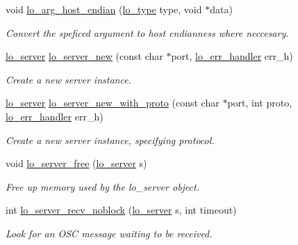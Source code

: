 \begin{CompactItemize}
void \hyperlink{group__liblolowlevel_g29fc246595334f29d97d11b0186b17bd}{lo\_\-arg\_\-host\_\-endian} (\hyperlink{group__liblo_g11838c576b0197c255ce805fd7434736}{lo\_\-type} type, void $\ast$data)
\begin{CompactList}\small\item\em Convert the speficed argument to host endianness where neccesary. \item\end{CompactList}\item 
\hyperlink{lo__types_8h_59067bf50cf8abb4371da6f03c9036c9}{lo\_\-server} \hyperlink{group__liblolowlevel_g78cfb23346e44465695293d4393447ae}{lo\_\-server\_\-new} (const char $\ast$port, \hyperlink{lo__types_8h_6663024c5970f397af12afdb906ab9bd}{lo\_\-err\_\-handler} err\_\-h)
\begin{CompactList}\small\item\em Create a new server instance. \item\end{CompactList}\item 
\hyperlink{lo__types_8h_59067bf50cf8abb4371da6f03c9036c9}{lo\_\-server} \hyperlink{group__liblolowlevel_g4afa474b11ed0d4511857ae79c56aaa1}{lo\_\-server\_\-new\_\-with\_\-proto} (const char $\ast$port, int proto, \hyperlink{lo__types_8h_6663024c5970f397af12afdb906ab9bd}{lo\_\-err\_\-handler} err\_\-h)
\begin{CompactList}\small\item\em Create a new server instance, specifying protocol. \item\end{CompactList}\item 
void \hyperlink{group__liblolowlevel_gd3dc9193e1eef0d71a4b046242b64216}{lo\_\-server\_\-free} (\hyperlink{lo__types_8h_59067bf50cf8abb4371da6f03c9036c9}{lo\_\-server} s)
\begin{CompactList}\small\item\em Free up memory used by the lo\_\-server object. \item\end{CompactList}\item 
int \hyperlink{group__liblolowlevel_g784a257252d05cc0e7210f4691f0661b}{lo\_\-server\_\-recv\_\-noblock} (\hyperlink{lo__types_8h_59067bf50cf8abb4371da6f03c9036c9}{lo\_\-server} s, int timeout)
\begin{CompactList}\small\item\em Look for an OSC message waiting to be received. \item\end{CompactList}\item 

\end{CompactItemize}

